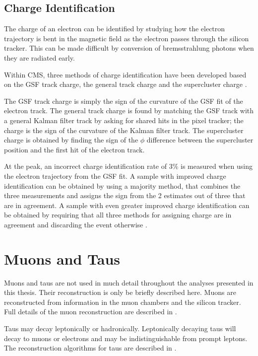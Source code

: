 \subsection{Charge Identification}
\label{sec:charge}
The charge of an electron can be identified by studying how the electron
trajectory is bent in the magnetic field as the electron passes through the
silicon tracker. This can be made difficult by conversion of bremsstrahlung
photons when they are radiated early.

Within CMS, three methods of charge identification have been developed based on
the {GSF} track charge, the general track charge and the supercluster charge
\cite{adam2009electron}. 

The {GSF} track charge is simply the sign of the curvature of the {GSF} fit of
the electron track.  The general track charge is found by matching the {GSF}
track with a general Kalman filter track by asking for shared hits in the pixel
tracker; the charge is the sign of the curvature of the Kalman filter track.
The supercluster charge is obtained by finding the sign of the $\phi$ difference
between the supercluster position and the first hit of the electron track.

At the \PZ peak, an incorrect charge identification rate of \unit{3}{\%}
\cite{adam2009electron} is measured when using the electron trajectory from the
{GSF} fit.  A sample with improved charge identification can be obtained by
using a majority method, that combines the three measurements and assigns the
sign from the 2 estimates out of three that are in agreement.  A sample with
even greater improved charge identification can be obtained by requiring that
all three methods for assigning charge are in agreement and discarding the event
otherwise \cite{adam2009electron}.

\section{Muons and Taus}
Muons and taus are not used in much detail throughout the analyses presented in
this thesis. Their reconstruction is only be briefly described here.  Muons are
reconstructed from information in the muon chambers and the silicon tracker.
Full details of the muon reconstruction are described in
\cite{collaboration2010muon}.

Taus may decay leptonically or hadronically. Leptonically decaying taus will
decay to muons or electrons and may be indistinguishable from prompt
leptons. The reconstruction algorithms for taus are described in
\cite{collaboration2012tau}.

